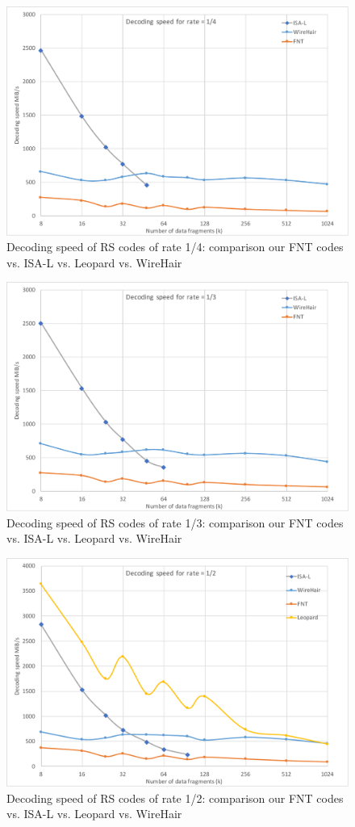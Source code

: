 \documentclass[oneside,9pt]{article}
\begin{document}
\begin{figure}[!ht]
\centering
\includegraphics[width=0.7\columnwidth]{Dec_Rate1-4.pdf}
\caption{Decoding speed of RS codes of rate 1/4: comparison our FNT codes vs. ISA-L vs. Leopard vs. WireHair}
\label{fig:comp_dec_rate_1_4}
\end{figure}

\begin{figure}[!ht]
\centering
\includegraphics[width=0.7\columnwidth]{Dec_Rate1-3.pdf}
\caption{Decoding speed of RS codes of rate 1/3: comparison our FNT codes vs. ISA-L vs. Leopard vs. WireHair}
\label{fig:comp_dec_rate_1_3}
\end{figure}

\begin{figure}[!ht]
\centering
\includegraphics[width=0.7\columnwidth]{Dec_Rate1-2.pdf}
\caption{Decoding speed of RS codes of rate 1/2: comparison our FNT codes vs. ISA-L vs. Leopard vs. WireHair}
\label{fig:comp_dec_rate_1_2}
\end{figure}
\end{document}
